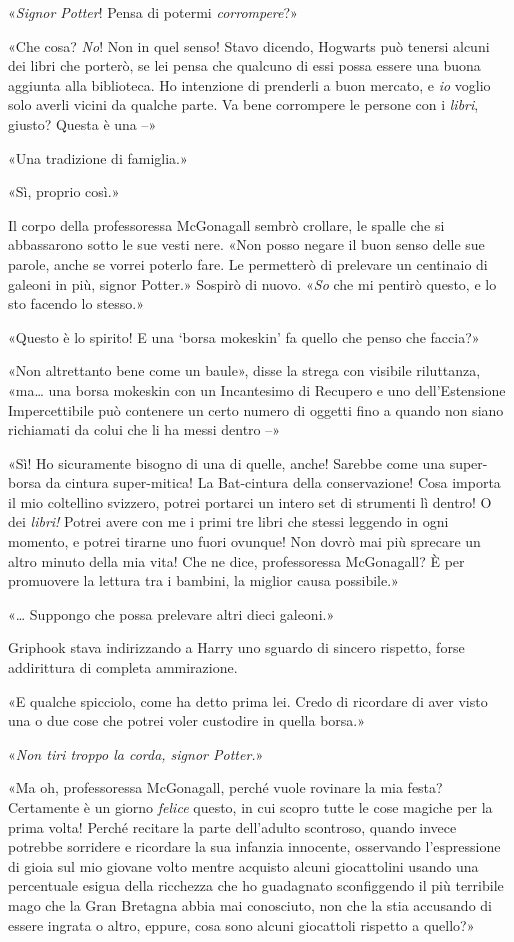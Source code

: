 «\textit{Signor Potter}! Pensa di potermi \textit{corrompere}?»

«Che cosa? \textit{No}! Non in quel senso! Stavo dicendo, Hogwarts può tenersi alcuni dei libri che porterò, se lei pensa che qualcuno di essi possa essere una buona aggiunta alla biblioteca. Ho intenzione di prenderli a buon mercato, e \textit{io} voglio solo averli vicini da qualche parte. Va bene corrompere le persone con i \textit{libri}, giusto? Questa è una –»

«Una tradizione di famiglia.»

«Sì, proprio così.»

Il corpo della professoressa McGonagall sembrò crollare, le spalle che si abbassarono sotto le sue vesti nere. «Non posso negare il buon senso delle sue parole, anche se vorrei poterlo fare. Le permetterò di prelevare un centinaio di galeoni in più, signor Potter.» Sospirò di nuovo. «\textit{So} che mi pentirò questo, e lo sto facendo lo stesso.»

«Questo è lo spirito! E una ‘borsa mokeskin’ fa quello che penso che faccia?»

«Non altrettanto bene come un baule», disse la strega con visibile riluttanza, «ma… una borsa mokeskin con un Incantesimo di Recupero e uno dell’Estensione Impercettibile può contenere un certo numero di oggetti fino a quando non siano richiamati da colui che li ha messi dentro –»

«Sì! Ho sicuramente bisogno di una di quelle, anche! Sarebbe come una super-borsa da cintura super-mitica! La Bat-cintura della conservazione! Cosa importa il mio coltellino svizzero, potrei portarci un intero set di strumenti lì dentro! O dei \textit{libri!} Potrei avere con me i primi tre libri che stessi leggendo in ogni momento, e potrei tirarne uno fuori ovunque! Non dovrò mai più sprecare un altro minuto della mia vita! Che ne dice, professoressa McGonagall? È per promuovere la lettura tra i bambini, la miglior causa possibile.»

«… Suppongo che possa prelevare altri dieci galeoni.»

Griphook stava indirizzando a Harry uno sguardo di sincero rispetto, forse addirittura di completa ammirazione.

«E qualche spicciolo, come ha detto prima lei. Credo di ricordare di aver visto una o due cose che potrei voler custodire in quella borsa.»

«\textit{Non tiri troppo la corda, signor Potter.}»

«Ma oh, professoressa McGonagall, perché vuole rovinare la mia festa? Certamente è un giorno \textit{felice} questo, in cui scopro tutte le cose magiche per la prima volta! Perché recitare la parte dell’adulto scontroso, quando invece potrebbe sorridere e ricordare la sua infanzia innocente, osservando l’espressione di gioia sul mio giovane volto mentre acquisto alcuni giocattolini usando una percentuale esigua della ricchezza che ho guadagnato sconfiggendo il più terribile mago che la Gran Bretagna abbia mai conosciuto, non che la stia accusando di essere ingrata o altro, eppure, cosa sono alcuni giocattoli rispetto a quello?»

